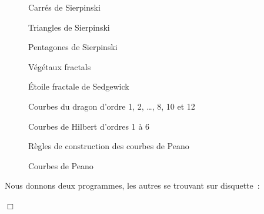 \begin{figure}[htbp]
 \caption{Carrés de Sierpinski}\label{fig:carsierp}
\end{figure}
\begin{figure}[htbp]
 \caption{Triangles de Sierpinski}\label{fig:trisierp}
\end{figure}
\begin{figure}[htbp]
 \caption{Pentagones de Sierpinski}\label{fig:pensierp}
\end{figure}
\begin{figure}[htbp]
 \caption{Végétaux fractals}\label{fig:vege}
\end{figure}
\begin{figure}[htbp]
 \caption{Étoile fractale de Sedgewick}\label{fig:sedgew}
\end{figure}
\begin{figure}[htbp]
 \caption{Courbes du dragon d'ordre 1, 2, \ldots, 8, 10 et 12}\label{fig:dragon}
\end{figure}
\begin{figure}[htbp]
 \caption{Courbes de Hilbert d'ordres 1 à 6}\label{fig:hilbert}
\end{figure}
\begin{figure}[htbp]
 \caption{Règles de construction des courbes de Peano}\label{fig:conspeano}
\end{figure}
\begin{figure}[htbp]
 \caption{Courbes de Peano}\label{fig:peano}
\end{figure}
\pagebreak[3]
\begin{corriges}{
\renewcommand{\carrenoir}{\hspace{-4mm}\rule{1.5mm}{1.5mm}\hspace{2.5mm}}
Nous donnons deux programmes, les autres se trouvant sur disquette~:
\label{prog:SegmentDeVonKoch}

\pagebreak[3]

\renewcommand{\carrenoir}{}
\noindent $\Box$}\end{corriges}

